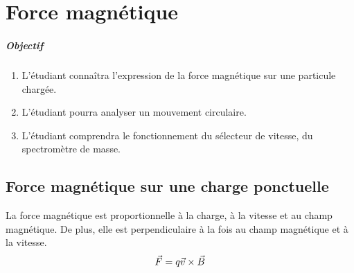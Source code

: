\chapter{Force magnétique}

\paragraph{Objectif}

\begin{enumerate}
  \item L'étudiant connaîtra l'expression de la force magnétique sur une
    particule chargée.
  \item L'étudiant pourra analyser un mouvement circulaire.
  \item L'étudiant comprendra le fonctionnement du sélecteur de vitesse, du
    spectromètre de masse.
\end{enumerate}



\section{Force magnétique sur une charge ponctuelle}


\begin{fondamentalbox}
La force magnétique est proportionnelle à la charge, à la vitesse et au champ
magnétique. De plus, elle est perpendiculaire à la fois au champ magnétique et
à la vitesse.
$$\vec{F} = q \vec{v} \times \vec{B}$$
\end{fondamentalbox}


